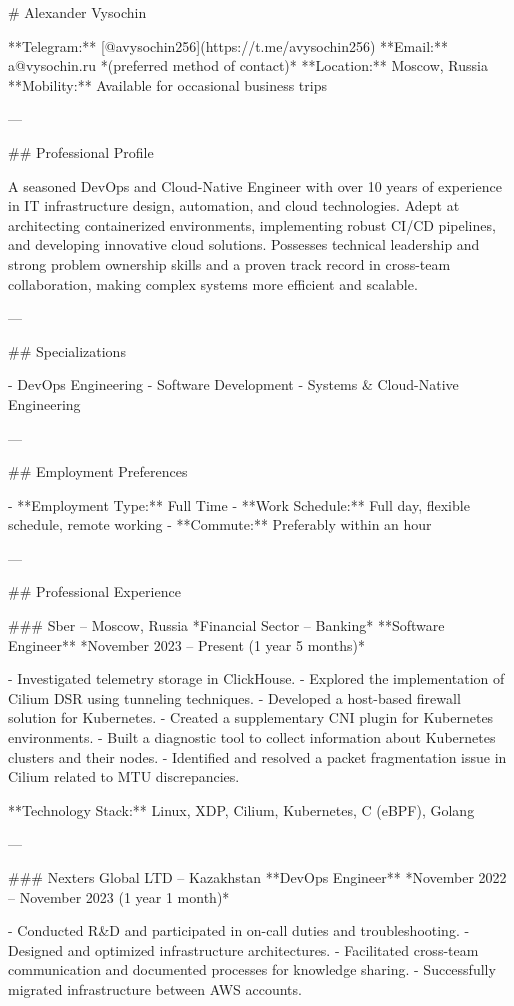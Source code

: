 # Alexander Vysochin

**Telegram:** [@avysochin256](https://t.me/avysochin256)  
**Email:** a@vysochin.ru *(preferred method of contact)*  
**Location:** Moscow, Russia  
**Mobility:** Available for occasional business trips

---

## Professional Profile

A seasoned DevOps and Cloud-Native Engineer with over 10 years of experience in IT infrastructure design, automation, and cloud technologies. Adept at architecting containerized environments, implementing robust CI/CD pipelines, and developing innovative cloud solutions. Possesses technical leadership and strong problem ownership skills and a proven track record in cross-team collaboration, making complex systems more efficient and scalable.

---

## Specializations

- DevOps Engineering
- Software Development
- Systems & Cloud-Native Engineering

---

## Employment Preferences

- **Employment Type:** Full Time  
- **Work Schedule:** Full day, flexible schedule, remote working  
- **Commute:** Preferably within an hour

---

## Professional Experience

### Sber – Moscow, Russia  
*Financial Sector – Banking*  
**Software Engineer**  
*November 2023 – Present (1 year 5 months)*

- Investigated telemetry storage in ClickHouse.
- Explored the implementation of Cilium DSR using tunneling techniques.
- Developed a host-based firewall solution for Kubernetes.
- Created a supplementary CNI plugin for Kubernetes environments.
- Built a diagnostic tool to collect information about Kubernetes clusters and their nodes.
- Identified and resolved a packet fragmentation issue in Cilium related to MTU discrepancies.

**Technology Stack:** Linux, XDP, Cilium, Kubernetes, C (eBPF), Golang

---

### Nexters Global LTD – Kazakhstan  
**DevOps Engineer**  
*November 2022 – November 2023 (1 year 1 month)*

- Conducted R&D and participated in on-call duties and troubleshooting.
- Designed and optimized infrastructure architectures.
- Facilitated cross-team communication and documented processes for knowledge sharing.
- Successfully migrated infrastructure between AWS accounts.

